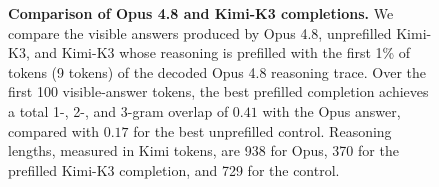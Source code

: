 \begin{figure}[t]
\begin{answercol}[equal height group=ansX4]
\end{answercol}
\caption{\textbf{Comparison of Opus 4.8 and Kimi-K3 completions.} We compare
the visible answers produced by Opus 4.8, unprefilled Kimi-K3, and Kimi-K3
whose reasoning is prefilled with the first 1\% of tokens (9 tokens) of the decoded
Opus 4.8 reasoning trace. Over the first 100 visible-answer tokens, the best
prefilled completion achieves a total 1-, 2-, and 3-gram overlap of $0.41$
with the Opus answer, compared with $0.17$ for the best unprefilled
control. Reasoning lengths, measured in Kimi tokens, are 938 for Opus,
370 for the prefilled Kimi-K3 completion, and 729 for the control.}
\label{fig:exhibit_X4}
\end{figure}
